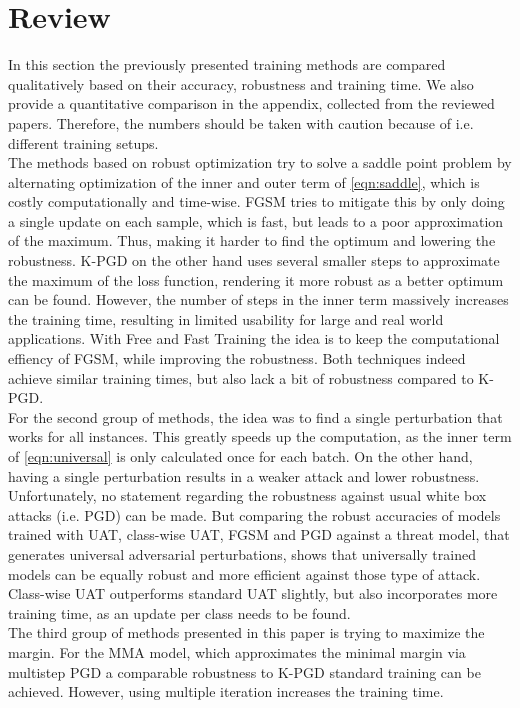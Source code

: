 \documentclass{article}
\begin{document}
\section{Review} \label{rev}
In this section the previously presented training methods are compared qualitatively based on their accuracy, robustness and training time. We also provide a quantitative comparison in the appendix, collected from the reviewed papers. Therefore, the numbers should be taken with caution because of i.e. different training setups. \\
The methods based on robust optimization try to solve a saddle point problem by alternating optimization of the inner and outer term of \ref{eqn:saddle}, which is costly computationally and time-wise. FGSM tries to mitigate this by only doing a single update on each sample, which is fast, but leads to a poor approximation of the maximum. Thus, making it harder to find the optimum and lowering the robustness. K-PGD on the other hand uses several smaller steps to approximate the maximum of the loss function, rendering it more robust as a better optimum can be found. However, the number of steps in the inner term massively increases the training time, resulting in limited usability for large and real world applications. With Free and Fast Training the idea is to keep the computational effiency of FGSM, while improving the robustness. Both techniques indeed achieve similar training times, but also lack a bit of robustness compared to K-PGD. \\
For the second group of methods, the idea was to find a single perturbation that works for all instances. This greatly speeds up the computation, as the inner term of \ref{eqn:universal} is only calculated once for each batch. On the other hand, having a single perturbation results in a weaker attack and lower robustness. Unfortunately, no statement regarding the robustness against usual white box attacks (i.e. PGD) can be made. But comparing the robust accuracies of models trained with UAT, class-wise UAT, FGSM and PGD against a threat model, that generates universal adversarial perturbations, shows that universally trained models can be equally robust and more efficient against those type of attack. Class-wise UAT outperforms standard UAT slightly, but also incorporates more training time, as an update per class needs to be found. \\
The third group of methods presented in this paper is trying to maximize the margin. For the MMA model, which approximates the minimal margin via multistep PGD a comparable robustness to K-PGD standard training can be achieved. However, using multiple iteration increases the training time.
  
\end{document}
